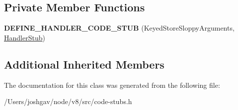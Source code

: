\subsection*{Private Member Functions}
\begin{DoxyCompactItemize}
\item 
{\bfseries D\+E\+F\+I\+N\+E\+\_\+\+H\+A\+N\+D\+L\+E\+R\+\_\+\+C\+O\+D\+E\+\_\+\+S\+T\+UB} (Keyed\+Store\+Sloppy\+Arguments, \hyperlink{classv8_1_1internal_1_1_handler_stub}{Handler\+Stub})\hypertarget{classv8_1_1internal_1_1_keyed_store_sloppy_arguments_stub_a22827f61fcc689d3b9c14dcd2fa9f9fa}{}\label{classv8_1_1internal_1_1_keyed_store_sloppy_arguments_stub_a22827f61fcc689d3b9c14dcd2fa9f9fa}

\end{DoxyCompactItemize}
\subsection*{Additional Inherited Members}


The documentation for this class was generated from the following file\+:\begin{DoxyCompactItemize}
\item 
/\+Users/joshgav/node/v8/src/code-\/stubs.\+h\end{DoxyCompactItemize}
